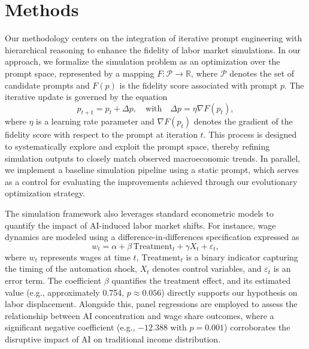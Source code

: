 \documentclass{article}
\begin{document}
\section{Methods}
Our methodology centers on the integration of iterative prompt engineering with hierarchical reasoning to enhance the fidelity of labor market simulations. In our approach, we formalize the simulation problem as an optimization over the prompt space, represented by a mapping \(F: \mathcal{P} \rightarrow \mathbb{R}\), where \(\mathcal{P}\) denotes the set of candidate prompts and \(F(p)\) is the fidelity score associated with prompt \(p\). The iterative update is governed by the equation
\[
p_{t+1} = p_t + \Delta p, \quad \text{with} \quad \Delta p = \eta \nabla F(p_t),
\]
where \(\eta\) is a learning rate parameter and \(\nabla F(p_t)\) denotes the gradient of the fidelity score with respect to the prompt at iteration \(t\). This process is designed to systematically explore and exploit the prompt space, thereby refining simulation outputs to closely match observed macroeconomic trends. In parallel, we implement a baseline simulation pipeline using a static prompt, which serves as a control for evaluating the improvements achieved through our evolutionary optimization strategy.

The simulation framework also leverages standard econometric models to quantify the impact of AI-induced labor market shifts. For instance, wage dynamics are modeled using a difference-in-differences specification expressed as
\[
w_t = \alpha + \beta\,\text{Treatment}_t + \gamma X_t + \varepsilon_t,
\]
where \(w_t\) represents wages at time \(t\), \(\text{Treatment}_t\) is a binary indicator capturing the timing of the automation shock, \(X_t\) denotes control variables, and \(\varepsilon_t\) is an error term. The coefficient \(\beta\) quantifies the treatment effect, and its estimated value (e.g., approximately 0.754, \(p\approx0.056\)) directly supports our hypothesis on labor displacement. Alongside this, panel regressions are employed to assess the relationship between AI concentration and wage share outcomes, where a significant negative coefficient (e.g., \(-12.388\) with \(p=0.001\)) corroborates the disruptive impact of AI on traditional income distribution.
\end{document}
